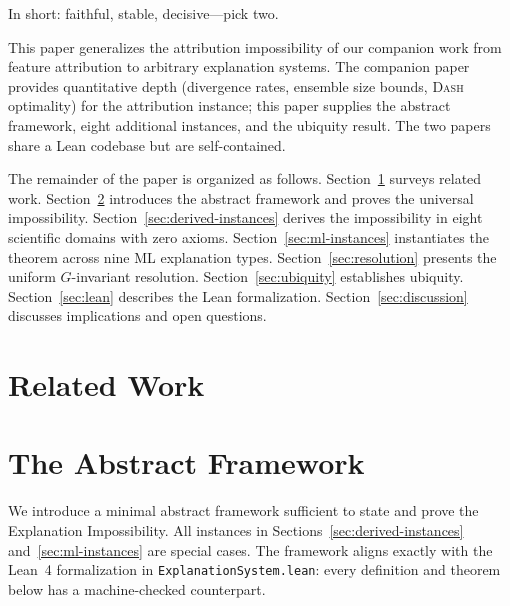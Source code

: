 \documentclass[11pt,a4paper]{article}
\newcommand{\DASH}{\textsc{Dash}}
\begin{document}
\noindent In short: faithful, stable, decisive---pick two.

This paper generalizes the attribution impossibility of our companion work
\citep{bilodeau2024impossibility} from feature attribution to arbitrary
explanation systems.  The companion paper provides quantitative depth
(divergence rates, ensemble size bounds, \DASH{} optimality) for the
attribution instance; this paper supplies the abstract framework, eight
additional instances, and the ubiquity result.  The two papers share a
Lean codebase but are self-contained.

The remainder of the paper is organized as follows.
Section~\ref{sec:related} surveys related work.
Section~\ref{sec:framework} introduces the abstract framework and proves
the universal impossibility.
Section~\ref{sec:derived-instances} derives the impossibility in eight
scientific domains with zero axioms.
Section~\ref{sec:ml-instances} instantiates the
theorem across nine ML explanation types.
Section~\ref{sec:resolution} presents the
uniform $G$-invariant resolution.  Section~\ref{sec:ubiquity} establishes
ubiquity.  Section~\ref{sec:lean} describes the Lean formalization.
Section~\ref{sec:discussion} discusses implications and open questions.

\section{Related Work}
\label{sec:related}



\section{The Abstract Framework}
\label{sec:framework}

We introduce a minimal abstract framework sufficient to state and prove the
Explanation Impossibility.  All instances in
Sections~\ref{sec:derived-instances} and~\ref{sec:ml-instances} are special cases.
The framework aligns exactly with the Lean~4 formalization in
\texttt{ExplanationSystem.lean}: every definition and theorem below has a
machine-checked counterpart.
\end{document}
